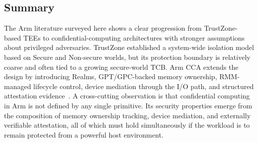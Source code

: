 \subsection{Summary}

The Arm literature surveyed here shows a clear progression from TrustZone-based TEEs to confidential-computing architectures with stronger assumptions about privileged adversaries. TrustZone established a system-wide isolation model based on Secure and Non-secure worlds, but its protection boundary is relatively coarse and often tied to a growing secure-world TCB. Arm CCA extends the design by introducing Realms, GPT/GPC-backed memory ownership, RMM-managed lifecycle control, device mediation through the I/O path, and structured attestation evidence~\cite{arm_trustzone_whitepaper,pinto2019trustzone,li2022cca,arm_cca_spec,arm_rme_spec,arm_rmm_spec}. A cross-cutting observation is that confidential computing in Arm is not defined by any single primitive. Its security properties emerge from the composition of memory ownership tracking, device mediation, and externally verifiable attestation, all of which must hold simultaneously if the workload is to remain protected from a powerful host environment.

